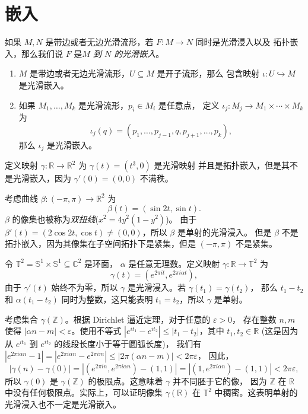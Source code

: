 \documentclass[fontset=none]{Notes}
\newcommand{\abs}[1]{\left|#1\right|}
\begin{document}
\section{嵌入}

如果 $M,N$ 是带边或者无边光滑流形，若 $F:M\to N$ 同时是光滑浸入以及
拓扑嵌入，那么我们说 $F$ 是\emph{$M$ 到 $N$ 的光滑嵌入}。

\begin{example}[光滑嵌入]
  \mbox{}
  \begin{enumerate}
    \item $M$ 是带边或者无边光滑流形，$U\subseteq M$ 是开子流形，那么
    包含映射 $\iota:U\hookrightarrow M$ 是光滑嵌入。
    \item 如果 $M_1,\dots,M_k$ 是光滑流形，$p_i\in M_i$ 是任意点，
    定义 $\iota_j:M_j\to M_1\times\cdots\times M_k$ 为
    \[
      \iota_j(q)=(p_1,\dots,p_{j-1},q,p_{j+1},\dots,p_k),  
    \]
    那么 $\iota_j$ 是光滑嵌入。
  \end{enumerate}
\end{example}

\begin{example}[光滑的拓扑嵌入]
  定义映射 $\gamma:\mathbb{R}\to\mathbb{R}^2$ 为 $\gamma(t)=(t^3,0)$ 是光滑映射
  并且是拓扑嵌入，但是其不是光滑嵌入，因为 $\gamma'(0)=(0,0)$ 不满秩。
\end{example}

\begin{example}[八字曲线]\label{exa:eight-curve}
  考虑曲线 $\beta:(-\pi,\pi)\to\mathbb{R}^2$ 为
  \[
    \beta(t)=(\sin 2t,\sin t) . 
  \]
  $\beta$ 的像集也被称为\emph{双扭线}($x^2=4y^2(1-y^2)$)。
  由于 $\beta'(t)=(2\cos 2t,\cos t)\neq (0,0)$，所以 $\beta$ 是单射的光滑浸入。
  但是 $\beta$ 不是拓扑嵌入，因为其像集在子空间拓扑下是紧集，但是
  $(-\pi,\pi)$ 不是紧集。
\end{example}

\begin{example}[环面上的稠密曲线]
  令 $\mathbb{T}^2=\mathbb{S}^1\times\mathbb{S}^1\subseteq\mathbb{C}^2$ 是环面，
  $\alpha$ 是任意无理数。定义映射 $\gamma:\mathbb{R}\to\mathbb{T}^2$ 为
  \[
    \gamma(t)=\left(e^{2\pi it},e^{2\pi i\alpha t}\right),
  \]
  由于 $\gamma'(t)$ 始终不为零，所以 $\gamma$ 是光滑浸入。若 $\gamma(t_1)=\gamma(t_2)$，
  那么 $t_1-t_2$ 和 $\alpha(t_1-t_2)$ 同时为整数，这只能表明 $t_1=t_2$，所以 $\gamma$ 是单射。

  考虑集合 $\gamma(\mathbb{Z})$。根据 Dirichlet 逼近定理，对于任意的 $\varepsilon>0$，
  存在整数 $n,m$ 使得 $\abs{\alpha n-m}<\varepsilon$。使用不等式
  $\abs{e^{it_1}-e^{it_2}}\leq\abs{t_1-t_2}$，其中 $t_1,t_2\in\mathbb{R}$ (这是因为从 $e^{it_1}$ 到 $e^{it_2}$ 的线段长度小于等于圆弧长度)，
  我们有 $\abs{e^{2\pi i\alpha n}-1}=\abs{e^{2\pi i\alpha n}-e^{2\pi i m}}\leq \abs{2\pi(\alpha n-m)}<2\pi \varepsilon$，
  因此，
  \[
    \abs{\gamma(n)-\gamma(0)}=\abs{\left(e^{2\pi i n},e^{2\pi i \alpha n}\right)-(1,1)}
    =\abs{\left(1,e^{2\pi i\alpha n}\right)-(1,1)}<2\pi\varepsilon , 
  \]
  所以 $\gamma(0)$ 是 $\gamma(\mathbb{Z})$ 的极限点。这意味着 $\gamma$ 并不同胚于它的像，
  因为 $\mathbb{Z}$ 在 $\mathbb{R}$ 中没有任何极限点。实际上，可以证明像集 $\gamma(\mathbb{R})$
  在 $\mathbb{T}^2$ 中稠密。这表明单射的光滑浸入也不一定是光滑嵌入。
\end{example}
\end{document}
